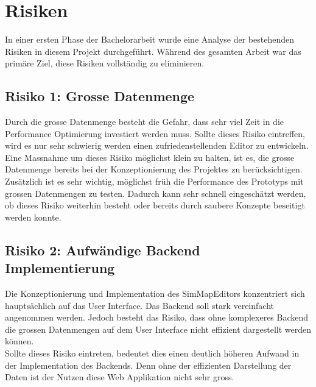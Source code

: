 \section{Risiken}
In einer ersten Phase der Bachelorarbeit wurde eine Analyse der bestehenden Risiken in diesem Projekt durchgeführt. Während des gesamten Arbeit war das primäre Ziel, diese Risiken vollständig zu eliminieren.
\subsection*{Risiko 1: Grosse Datenmenge}
Durch die grosse Datenmenge besteht die Gefahr, dass sehr viel Zeit in die Performance Optimierung investiert werden muss. Sollte dieses Risiko eintreffen, wird es nur sehr schwierig werden einen zufriedenstellenden Editor zu entwickeln.\\
Eine Massnahme um dieses Risiko möglichst klein zu halten, ist es, die grosse Datenmenge bereits bei der Konzeptionierung des Projektes zu berücksichtigen. Zusätzlich ist es sehr wichtig, möglichst früh die Performance des Prototyps mit grossen Datenmengen zu testen. Dadurch kann sehr schnell eingeschätzt werden, ob dieses Risiko weiterhin besteht oder bereits durch saubere Konzepte beseitigt werden konnte.
\subsection*{Risiko 2: Aufwändige Backend Implementierung}
Die Konzeptionierung und Implementation des SimMapEditors konzentriert sich hauptsächlich auf das User Interface. Das Backend soll stark vereinfacht angenommen werden. Jedoch besteht das Risiko, dass ohne komplexeres Backend die grossen Datenmengen auf dem User Interface nicht effizient dargestellt werden können.\\
Sollte dieses Risiko eintreten, bedeutet dies einen deutlich höheren Aufwand in der Implementation des Backends. Denn ohne der effizienten Darstellung der Daten ist der Nutzen diese Web Applikation nicht sehr gross.